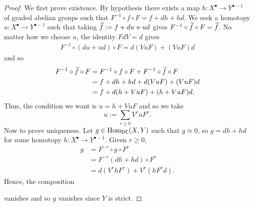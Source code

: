 \documentclass[11pt]{article}
\newcommand{\DC}{\mathsf{DC}} %
\newcommand{\W}{\mathcal{W}}
\begin{document}
\begin{proof}
We first prove existence. By hypothesis there exists a map $h: X^{\bullet}\to Y^{\bullet-1}$ of graded abelian groups such that $F^{-1}\circ f\circ F=f+dh+hd$. We seek a homotopy $u: X^{\bullet}\to Y^{\bullet-1}$ such that taking $\widetilde{f}:=f+du+ud$ gives $F^{-1}\circ\widetilde{f}\circ F=\widetilde{f}$. No matter how we choose $u$, the identity $FdV=d$ gives
\begin{align*}
F^{-1}\circ(du+ud)\circ F
=d(VuF)+(VuF)d
\end{align*}
and so 
\begin{align*}
F^{-1}\circ\widetilde{f}\circ F
&=F^{-1}\circ f\circ F+F^{-1}\circ\widetilde{f}\circ F \\
&=f+dh+hd+d(VuF)+(VuF)d \\
&=f+d(h+VuF)+(h+VuF)d.
\end{align*}
Thus, the condition we want is $u=h+VuF$ and so we take
$$u:=\sum_{r\geq0}V^ruF^r.$$
Now to prove uniqueness. Let $g\in\Hom_{\DC}(X,Y)$ such that $g\simeq0$, so $g=dh+hd$ for some homotopy $h: X^{\bullet}\to Y^{\bullet-1}$. Given $r\geq0$,
\begin{align*}
g
&=F^{-r}\circ g\circ F^r \\
&=F^{-r}(dh+hd)\circ F^r \\
&=d(V^rhF^r)+V^r(hF^rd).
\end{align*}
Hence, the composition
\begin{center}
\end{center}
vanishes and so $g$ vanishes since $Y$ is strict.
\end{proof}
\end{document}
